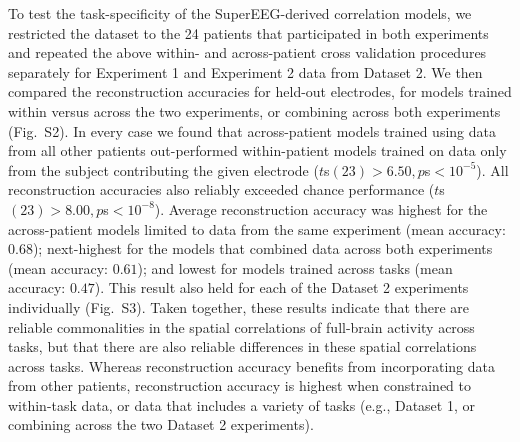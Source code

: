 \documentclass[11pt]{article}
\newcommand{\perexptaskrecon}{S2}
\newcommand{\perexptaskreconseparated}{S3}
\begin{document}
To test the task-specificity of the SuperEEG-derived correlation
models, we restricted the dataset to the 24 patients that participated
in both experiments and repeated the above within- and across-patient cross validation
procedures separately for Experiment 1 and Experiment 2 data from
Dataset 2.  We then compared the reconstruction accuracies for held-out
electrodes, for models trained within versus across the two
experiments, or combining across both experiments
(Fig.~\perexptaskrecon).  In every case we found that across-patient
models trained using data from all other patients out-performed
within-patient models trained on data only from the subject
contributing the given electrode ($t$s$(23) > 6.50, p$s$ < 10^{-5}$).  All
reconstruction accuracies also reliably exceeded chance performance
($t$s$(23) > 8.00, p$s$ < 10^{-8}$).  Average reconstruction accuracy was
highest for the across-patient models limited to data from the same
experiment (mean accuracy: $0.68$); next-highest for the
models that combined data across both experiments (mean
accuracy: $0.61$); and lowest for models trained across tasks (mean
accuracy: $0.47$).  This result also held for each of the Dataset 2
experiments individually (Fig.~\perexptaskreconseparated).  Taken
together, these results indicate that there are reliable commonalities
in the spatial correlations of full-brain activity across tasks, but
that there are also reliable differences in these spatial correlations
across tasks.  Whereas reconstruction accuracy benefits from
incorporating data from other patients, reconstruction accuracy is
highest when constrained to within-task data, or data that includes a
variety of tasks (e.g., Dataset 1, or combining across the two Dataset
2 experiments).
\end{document}
